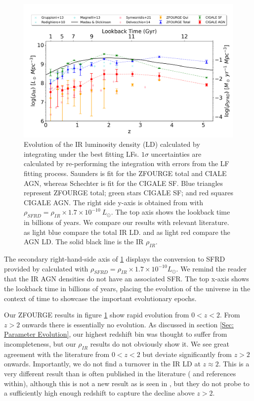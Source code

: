 \begin{figure}[h]
    \centering
    \includegraphics[width=\textwidth]{Figures/SFRD.png}
    \caption{Evolution of the IR luminosity density (LD) calculated by integrating under the best fitting LFs. $1\sigma$ uncertainties are calculated by re-performing the integration with errors from the LF fitting process. Saunders is fit for the ZFOURGE total and CIALE AGN, whereas Schechter is fit for the CIGALE SF. Blue triangles represent ZFOURGE total; green stars CIGALE SF; and red squares CIGALE AGN. The right side y-axis is obtained from \cite{kennicutt_global_1998} with $\rho_{SFRD} = \rho_{IR} \times 1.7\times10^{-10} \ L_{\odot}$. The top axis shows the lookback time in billions of years. We compare our results with relevant literature. \cite{gruppioni_herschel_2013, rodighiero_mid-_2010, magnelli_deepest_2013} as light blue compare the total IR LD. \cite{symeonidis_agn_2021} and \cite{delvecchio_tracing_2014} as light red compare the AGN LD. The solid black line is the \cite{madau_cosmic_2014} IR $\rho_{IR}$.}
    \label{Fig: SFRD}
\end{figure}

The secondary right-hand-side axis of \ref{Fig: SFRD} displays the conversion to SFRD provided by \cite{kennicutt_global_1998} calculated with $\rho_{SFRD} = \rho_{IR} \times 1.7\times10^{-10} L_{\odot}$. We remind the reader that the IR AGN densities do not have an associated SFR. The top x-axis shows the lookback time in billions of years, placing the evolution of the universe in the context of time to showcase the important evolutionary epochs.

Our ZFOURGE results in figure \ref{Fig: SFRD} show rapid evolution from $0<z<2$. From $z>2$ onwards there is essentially no evolution. As discussed in section \ref{Sec: Parameter Evolution}, our highest redshift bin was thought to suffer from incompleteness, but our $\rho_{IR}$ results do not obviously show it. We see great agreement with the literature from $0<z<2$ but deviate significantly from $z>2$ onwards. Importantly, we do not find a turnover in the IR LD at $z\approx2$. This is a very different result than is often published in the literature (\citealp{gruppioni_herschel_2013, madau_cosmic_2014, magnelli_deepest_2013, lutz_far-infrared_2014} and references within), although this is not a new result as is seen in \cite{rodighiero_mid-_2010}, but they do not probe to a sufficiently high enough redshift to capture the decline above $z>2$.

